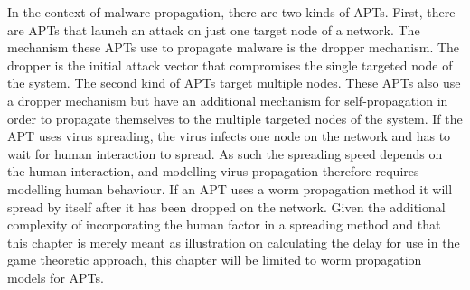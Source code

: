 In the context of malware propagation, there are two kinds of APTs. First, there are APTs that launch an attack on just one target node of a network. The mechanism these APTs use to propagate malware is the dropper mechanism. The dropper is the initial attack vector that compromises the single targeted node of the system. The second kind of APTs target multiple nodes. These APTs also use a dropper mechanism but have an additional mechanism for self-propagation in order to propagate themselves to the multiple targeted nodes of the system. If the APT uses virus spreading, the virus infects one node on the network and has to wait for human interaction to spread. As such the spreading speed depends on the human interaction, and modelling virus propagation therefore requires modelling human behaviour. If an APT uses a worm propagation method it will spread by itself after it has been dropped on the network. Given the additional complexity of incorporating the human factor in a spreading method and that this chapter is merely meant as illustration on calculating the delay for use in the game theoretic approach, this chapter will be limited to worm propagation models for APTs. \\

